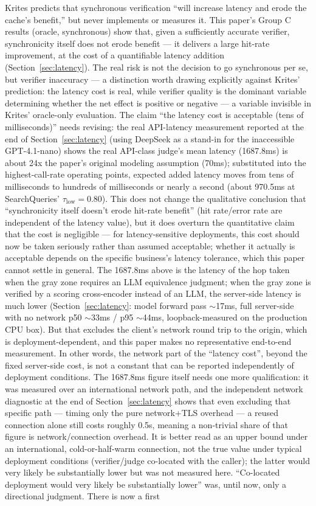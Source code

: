 \documentclass[11pt]{article}
\newcommand{\taulow}{\ensuremath{\tau_{\text{low}}}}
\begin{document}
Krites predicts that synchronous verification ``will increase latency and erode the cache's benefit,'' but never implements or measures it. This paper's Group C results (oracle, synchronous) show that, given a sufficiently accurate verifier, synchronicity itself does not erode benefit --- it delivers a large hit-rate improvement, at the cost of a quantifiable latency addition (Section~\ref{sec:latency}). The real risk is not the decision to go synchronous per se, but verifier inaccuracy --- a distinction worth drawing explicitly against Krites' prediction: the latency cost is real, while verifier quality is the dominant variable determining whether the net effect is positive or negative --- a variable invisible in Krites' oracle-only evaluation. The claim ``the latency cost is acceptable (tens of milliseconds)'' needs revising: the real API-latency measurement reported at the end of Section~\ref{sec:latency} (using DeepSeek as a stand-in for the inaccessible GPT-4.1-nano) shows the real API-class judge's mean latency (1687.8ms) is about 24x the paper's original modeling assumption (70ms); substituted into the highest-call-rate operating points, expected added latency moves from tens of milliseconds to hundreds of milliseconds or nearly a second (about 970.5ms at SearchQueries' $\taulow=0.80$). This does not change the qualitative conclusion that ``synchronicity itself doesn't erode hit-rate benefit'' (hit rate/error rate are independent of the latency value), but it does overturn the quantitative claim that the cost is negligible --- for latency-sensitive deployments, this cost should now be taken seriously rather than assumed acceptable; whether it actually is acceptable depends on the specific business's latency tolerance, which this paper cannot settle in general. The 1687.8ms above is the latency of the hop taken when the gray zone requires an LLM equivalence judgment; when the gray zone is verified by a scoring cross-encoder instead of an LLM, the server-side latency is much lower (Section~\ref{sec:latency}: model forward pass $\sim$17ms, full server-side with no network p50 $\sim$33ms / p95 $\sim$44ms, loopback-measured on the production CPU box). But that excludes the client's network round trip to the origin, which is deployment-dependent, and this paper makes no representative end-to-end measurement. In other words, the network part of the ``latency cost'', beyond the fixed server-side cost, is not a constant that can be reported independently of deployment conditions. The 1687.8ms figure itself needs one more qualification: it was measured over an international network path, and the independent network diagnostic at the end of Section~\ref{sec:latency} shows that even excluding that specific path --- timing only the pure network+TLS overhead --- a reused connection alone still costs roughly 0.5s, meaning a non-trivial share of that figure is network/connection overhead. It is better read as an upper bound under an international, cold-or-half-warm connection, not the true value under typical deployment conditions (verifier/judge co-located with the caller); the latter would very likely be substantially lower but was not measured here. ``Co-located deployment would very likely be substantially lower'' was, until now, only a directional judgment. There is now a first 
\end{document}
